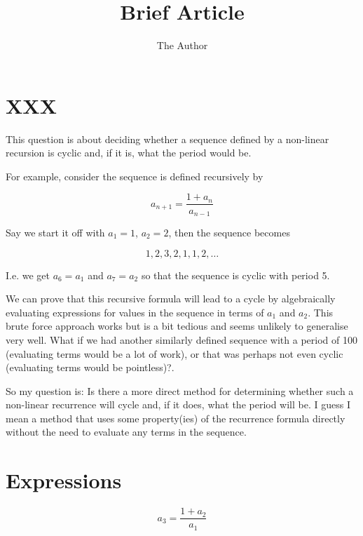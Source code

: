 \documentclass[11pt]{amsart}
\title{Brief Article}
\author{The Author}
\begin{document}
\maketitle

\section{XXX}

This question is about deciding whether a sequence defined by a non-linear recursion is cyclic and, if it is, what the period would be.

For example, consider the sequence is defined recursively by 

$$
a_{n+1} =
\frac{1 + a_{n}}{a_{n-1}}
$$

Say we start it off with $a_{1}=1$, $a_{2}= 2$, then the sequence becomes

$$
1, 2, 3, 2, 1, 1, 2, \ldots 
$$

I.e. we get $a_{6} = a_{1}$ and $a_{7} = a_{2}$ so that the sequence is cyclic with period 5.

We can prove that this recursive formula will lead to a cycle by algebraically evaluating expressions for values in the sequence in terms of $a_{1}$ and $a_{2}$.
This brute force approach works but is a bit tedious and seems unlikely to generalise very well. What if we had another similarly defined  sequence with a period of 100 (evaluating terms would be a lot of work), or that was perhaps not even cyclic (evaluating terms would be pointless)?.

So my question is: Is there a more direct method for determining whether such a non-linear recurrence will cycle and, if it does, what the period will be. I guess I mean a method that uses some property(ies) of the recurrence formula directly without the need to evaluate any terms in the sequence.

\newpage

\section{Expressions}


$$
a_{3}
=
\frac{1 + a_{2}}{a_{1}}
$$
\end{document}
